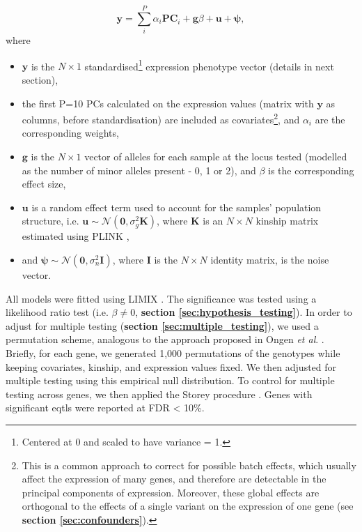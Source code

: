 \begin{equation}\label{eq:LMM_ipsc_eqtl}
    \mathbf{y} = \sum_i^{P}\alpha_i \mathbf{PC}_i + \mathbf{g}\beta + \mathbf{u} + \boldsymbol{\psi},  
\end{equation}
where 
\begin{itemize}
    \item $\mathbf{y}$ is the $N \times 1$ standardised\footnote{Centered at 0 and scaled to have variance = 1.} expression phenotype vector (details in next section),
    \item the first P=10 PCs calculated on the expression values (matrix with $\mathbf{y}$ as columns, before standardisation) are included as covariates\footnote{This is a common approach to correct for possible batch effects, which usually affect the expression of many genes, and therefore are detectable in the principal components of expression. 
    Moreover, these global effects are orthogonal to the effects of a single variant on the expression of one gene (see \textbf{section 
    \ref{sec:confounders}}).}, and $\alpha_i$ are the corresponding weights,
    \item $\mathbf{g}$ is the $N \times 1$ vector of alleles for each sample at the locus tested (modelled as the number of minor alleles present - 0, 1 or 2), and $\beta$ is the corresponding effect size,
    \item $\mathbf{u}$ is a random effect term used to account for 
    the samples' 
    population structure, 
    i.e.
    $\mathbf{u} \sim \mathcal{N}(\mathbf{0}, \sigma_g^2\mathbf{K})$, where $\mathbf{K}$ is an $N \times N$ kinship matrix estimated using PLINK \cite{purcell2007plink},
    \item and $\boldsymbol{\psi} \sim \mathcal{N}(\mathbf{0}, \sigma_n^2\mathbf{I})$, where $\mathbf{I}$ is the $N \times N$ identity matrix, is the noise vector.
\end{itemize}

\vspace{1.5mm}

\newpage

All models were fitted using LIMIX \cite{lippert2014limix, casale2015efficient}. 
The significance was tested using a likelihood ratio test (i.e. $\beta \neq 0$, \textbf{section 
\ref{sec:hypothesis_testing}}).
In order to adjust for multiple testing (\textbf{section
\ref{sec:multiple_testing}}),
we used a permutation scheme, analogous to the approach proposed in Ongen \textit{et al}. \cite{ongen2016fast}. 
Briefly, for each gene, we generated 1,000 permutations of the genotypes while keeping covariates, kinship, and expression values fixed. 
We then adjusted for multiple testing using this empirical null distribution.
To control for multiple testing across genes, we then applied the Storey procedure \cite{storey2003statistical}. 
Genes with significant \glspl{eqtl} were reported at FDR < 10\%.

